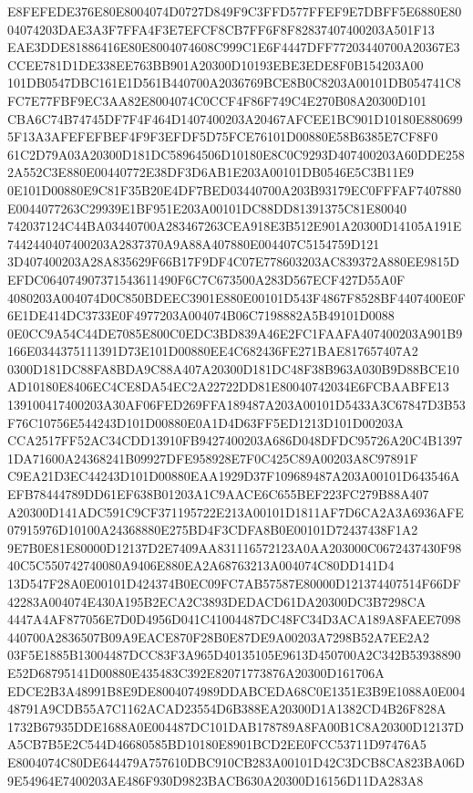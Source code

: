 \documentclass[UTF8,fontset=fandol,zihao=-4,a4paper]{ctexart}
\begin{document}
{{E8FEFEDE376E80E8004074D0727D849F9C3FFD577FFEF9E7DBFF5E6880E8004074203DAE3A3F7FFA4F3E7EFCF8CB7FF6F8F82837407400203A501F13
EAE3DDE81886416E80E8004074608C999C1E6F4447DFF77203440700A20367E3CCEE781D1DE338EE763BB901A20300D10193EBE3EDE8F0B154203A00
101DB0547DBC161E1D561B440700A2036769BCE8B0C8203A00101DB054741C8FC7E77FBF9EC3AA82E8004074C0CCF4F86F749C4E270B08A20300D101
CBA6C74B74745DF7F4F464D1407400203A20467AFCEE1BC901D10180E8806995F13A3AFEFEFBEF4F9F3EFDF5D75FCE76101D00880E58B6385E7CF8F0
61C2D79A03A20300D181DC58964506D10180E8C0C9293D407400203A60DDE2582A552C3E880E00440772E38DF3D6AB1E203A00101DB0546E5C3B11E9
0E101D00880E9C81F35B20E4DF7BED03440700A203B93179EC0FFFAF7407880E0044077263C29939E1BF951E203A00101DC88DD81391375C81E80040
742037124C44BA03440700A283467263CEA918E3B512E901A20300D14105A191E7442440407400203A2837370A9A88A407880E004407C5154759D121
3D407400203A28A835629F66B17F9DF4C07E778603203AC839372A880EE9815DEFDC064074907371543611490F6C7C673500A283D567ECF427D55A0F
4080203A004074D0C850BDEEC3901E880E00101D543F4867F8528BF4407400E0F6E1DE414DC3733E0F4977203A004074B06C7198882A5B49101D0088
0E0CC9A54C44DE7085E800C0EDC3BD839A46E2FC1FAAFA407400203A901B9166E0344375111391D73E101D00880EE4C682436FE271BAE817657407A2
0300D181DC88FA8BDA9C88A407A20300D181DC48F38B963A030B9D88BCE10AD10180E8406EC4CE8DA54EC2A22722DD81E80040742034E6FCBAABFE13
139100417400203A30AF06FED269FFA189487A203A00101D5433A3C67847D3B53F76C10756E544243D101D00880E0A1D4D63FF5ED1213D101D00203A
CCA2517FF52AC34CDD13910FB9427400203A686D048DFDC95726A20C4B13971DA71600A24368241B09927DFE958928E7F0C425C89A00203A8C97891F
C9EA21D3EC44243D101D00880EAA1929D37F109689487A203A00101D643546AEFB78444789DD61EF638B01203A1C9AACE6C655BEF223FC279B88A407
A20300D141ADC591C9CF371195722E213A00101D1811AF7D6CA2A3A6936AFE07915976D10100A24368880E275BD4F3CDFA8B0E00101D72437438F1A2
9E7B0E81E80000D12137D2E7409AA831116572123A0AA203000C0672437430F9840C5C550742740080A9406E880EA2A68763213A004074C80DD141D4
13D547F28A0E00101D424374B0EC09FC7AB57587E80000D121374407514F66DF42283A004074E430A195B2ECA2C3893DEDACD61DA20300DC3B7298CA
4447A4AF877056E7D0D4956D041C41004487DC48FC34D3ACA189A8FAEE7098440700A2836507B09A9EACE870F28B0E87DE9A00203A7298B52A7EE2A2
03F5E1885B13004487DCC83F3A965D40135105E9613D450700A2C342B53938890E52D68795141D00880E435483C392E82071773876A20300D161706A
EDCE2B3A48991B8E9DE8004074989DDABCEDA68C0E1351E3B9E1088A0E00448791A9CDB55A7C1162ACAD23554D6B388EA20300D1A1382CD4B26F828A
1732B67935DDE1688A0E004487DC101DAB178789A8FA00B1C8A20300D12137DA5CB7B5E2C544D46680585BD10180E8901BCD2EE0FCC53711D97476A5
E8004074C80DE644479A757610DBC910CB283A00101D42C3DCB8CA823BA06D9E54964E7400203AE486F930D9823BACB630A20300D16156D11DA283A8
}}
\end{document}
